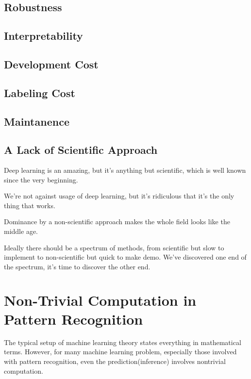 \documentclass[11pt]{article} 	%
\theoremstyle{definition}
\begin{document}
\subsection{Robustness}

\subsection{Interpretability}

\subsection{Development Cost}

\subsection{Labeling Cost}

\subsection{Maintanence}

\subsection{A Lack of Scientific Approach}

Deep learning is an amazing, but it's anything but scientific, which is well known since the very beginning.

We're not against usage of deep learning, but it's ridiculous that it's the only thing that works.

Dominance by a non-scientific approach makes the whole field looks like the middle age.

Ideally there should be a spectrum of methods, from scientific but slow to implement to non-scientific but quick to make demo. We've discovered one end of the spectrum, it's time to discover the other end.




\section{Non-Trivial Computation  in Pattern Recognition}

The typical setup of machine learning theory states everything in mathematical terms.
However, for many machine learning problem, especially those involved with pattern recognition, even the prediction(inference) involves nontrivial computation.
\end{document}

